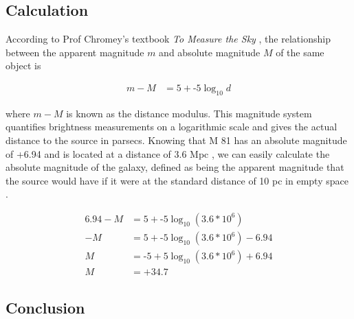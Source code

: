 \documentclass[]{aastex63}
\begin{document}
\subsection{Calculation}

According to Prof Chromey's textbook \textit{To Measure the Sky} \citep{Chromey_2016}, the relationship between the apparent magnitude $m$ and absolute magnitude $M$ of the same object is

\begin{align}
m - M &= 5 + \text{-}5 \log_{10}d
\end{align}

where $m - M$ is known as the distance modulus. This magnitude system quantifies brightness measurements on a logarithmic scale and gives the actual distance to the source in parsecs. Knowing that M 81 has an absolute magnitude of +6.94 \citep{nasa} and is located at a distance of 3.6 Mpc \citep{Gurzadyan}, we can easily calculate the absolute magnitude of the galaxy, defined as being the apparent magnitude that the source would have if it were at the standard distance of 10 pc in empty space \citep{Chromey_2016}.

\begin{align}
6.94 - M &= 5 + \text{-}5 \log_{10}(3.6* 10^6)\\
-M &= 5 + \text{-}5 \log_{10}(3.6* 10^6) - 6.94\\
M &= \text{-}5 + 5 \log_{10}(3.6* 10^6) + 6.94\\
M &= +34.7
\end{align}

\subsection{Conclusion}
\end{document}
